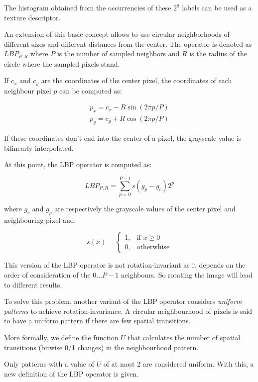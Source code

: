 \documentclass[10pt,twocolumn,letterpaper]{article}
\begin{document}
The histogram obtained from the occurrencies of these $2^8$ labels can be used as a texture descriptor.

An extension of this basic concept allows to use circular neighborhoods of different sizes and different distances from the center. The operator is denoted as $LBP_{P, R}$ where $P$ is the number of sampled neighbors and $R$ is the radius of the circle where the sampled pixels stand.

If $c_x$ and $c_y$ are the coordinates of the center pixel, the coordinates of each neighbour pixel $p$ can be computed as:

\begin{gather*}
	p_x = c_x - R\sin(2\pi p/P) \\ 
	p_y = c_y + R\cos(2\pi p/P)
\end{gather*}

If these coordinates don't end into the center of a pixel, the grayscale value is bilinearly interpolated.

At this point, the LBP operator is computed as:

\[LBP_{P, R} = \sum_{p = 0}^{P - 1}s(g_p - g_c)2^p\]

where $g_c$ and $g_p$ are respectively the grayscale values of the center pixel and neighbouring pixel and:

\[s(x) = \begin{cases} 1, & \mbox{if } x \ge 0 \\ 0, & \mbox{otherwhise} \end{cases}\]

This version of the LBP operator is not rotation-invariant as it depends on the order of consideration of the $0...P-1$ neighbours. So rotating the image will lead to different results.


To solve this problem, another variant of the LBP operator considers \textit{uniform patterns} to achieve rotation-invariance. A circular neighbourhood of pixels is said to have a uniform pattern if there are few spatial transitions.

More formally, we define the function $U$ that calculates the number of spatial transitions (bitwise 0/1 changes) in the neighbourhood pattern.

Only patterns with a value of $U$ of at most 2 are considered uniform. With this, a new definition of the LBP operator is given.
\end{document}
